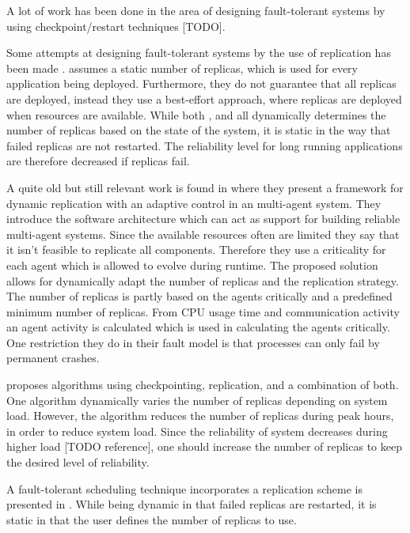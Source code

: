 \documentclass{cslthse-msc}
\begin{document}
A lot of work has been done in the area of designing fault-tolerant systems by using checkpoint/restart techniques [TODO]. %

Some attempts at designing fault-tolerant systems by the use of replication has been made \cite{designFaultTolerantSched}  \cite{evalReplicationSched} \cite{taskSchedulingReplication} \cite{effTaskReplMobGrid}. \cite{evalReplicationSched} assumes a static number of replicas, which is used for every application being deployed. Furthermore, they do not guarantee that all replicas are deployed, instead they use a best-effort approach, where replicas are deployed when resources are available. While both \cite{effTaskReplMobGrid}, \cite{taskSchedulingReplication} and \cite{designFaultTolerantSched} all dynamically determines the number of replicas based on the state of the system, it is static in the way that failed replicas are not restarted. The reliability level for long running applications are therefore decreased if replicas fail.

A quite old but still relevant work is found in \cite{dynAdaptRepl} where they present a framework for dynamic replication with an adaptive control in an multi-agent system. They introduce the software architecture which can act as support for building reliable multi-agent systems. Since the available resources often are limited they say that it isn't feasible to replicate all components. Therefore they use a criticality for each agent which is allowed to evolve during runtime. The proposed solution allows for dynamically adapt the number of replicas and the replication strategy. The number of replicas is partly based on the agents critically and a predefined minimum number of replicas. From CPU usage time and communication activity an agent activity is calculated which is used in calculating the agents critically. One restriction they do in their fault model is that processes can only fail by permanent crashes.

\cite{adaptiveCheckPointAndRep} proposes algorithms using checkpointing, replication, and a combination of both. One algorithm dynamically varies the number of replicas depending on system load. However, the algorithm reduces the number of replicas during peak hours, in order to reduce system load. Since the reliability of system decreases during higher load [TODO reference], one should increase the number of replicas to keep the desired level of reliability.

A fault-tolerant scheduling technique incorporates a replication scheme is presented in \cite{faultTolerantSchedPolicy}. While being dynamic in that failed replicas are restarted, it is static in that the user defines the number of replicas to use.
\end{document}
